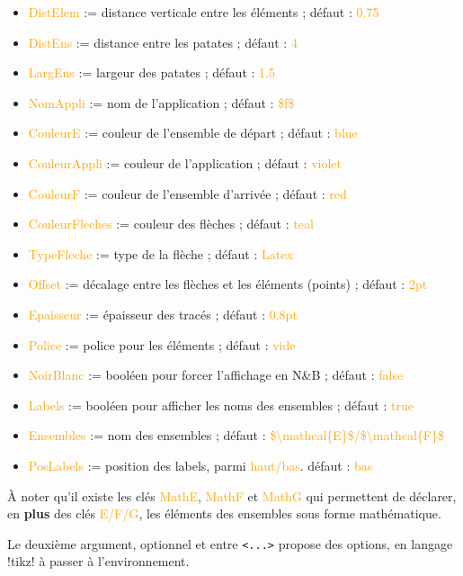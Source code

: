 \documentclass[french,a4paper,11pt]{article}
\newcommand\Cle[1]{{\small\sffamily\textlangle \textcolor{orange}{#1}\textrangle}}
\begin{document}
{{\begin{tipblock}
\begin{itemize}
	\item \Cle{DistElem} := distance verticale entre les éléments ; \hfill{}défaut : \Cle{0.75}
	\item \Cle{DistEns} := distance entre les \og patates \fg{} ; \hfill{}défaut : \Cle{4}
	\item \Cle{LargEns} := largeur des \og patates \fg{} ; \hfill{}défaut : \Cle{1.5}
	\item \Cle{NomAppli} := nom de l'application ; \hfill{}défaut : \Cle{\$f\$}
	\item \Cle{CouleurE} := couleur de l'ensemble de départ ; \hfill{}défaut : \Cle{blue}
	\item \Cle{CouleurAppli} := couleur de l'application ; \hfill{}défaut : \Cle{violet}
	\item \Cle{CouleurF} := couleur de l'ensemble d'arrivée ; \hfill{}défaut : \Cle{red}
	\item \Cle{CouleurFleches} := couleur des flèches ; \hfill{}défaut : \Cle{teal}
	\item \Cle{TypeFleche} := type de la flèche  ; \hfill{}défaut : \Cle{Latex}
	\item \Cle{Offset} := décalage entre les flèches et les éléments (points) ; \hfill{}défaut : \Cle{2pt}
	\item \Cle{Epaisseur} := épaisseur des tracés ; \hfill{}défaut : \Cle{0.8pt}
	\item \Cle{Police} := police pour les éléments ; \hfill{}défaut : \Cle{vide}
	\item \Cle{NoirBlanc} := booléen pour forcer l'affichage en N\&{}B ; \hfill{}défaut : \Cle{false}
	\item \Cle{Labels} := booléen pour afficher les noms des ensembles ; \hfill{}défaut : \Cle{true}
	\item \Cle{Ensembles} := nom des ensembles  ; \hfill{}défaut : \Cle{\$\textbackslash mathcal\{E\}\$/\$\textbackslash  mathcal\{F\}\$}
	\item \Cle{PosLabels} := position des labels, parmi \Cle{haut/bas}. \hfill{}défaut : \Cle{bas}
\end{itemize}

À noter qu'il existe les clés \Cle{MathE}, \Cle{MathF} et \Cle{MathG} qui permettent de déclarer, en \textbf{plus} des clés \Cle{E/F/G}, les éléments des ensembles sous forme mathématique.

\smallskip

Le deuxième argument, optionnel et entre \texttt{<...>} propose des options, en langage \packagetex!tikz! à passer à l'environnement.


\end{tipblock}}}
\end{document}
